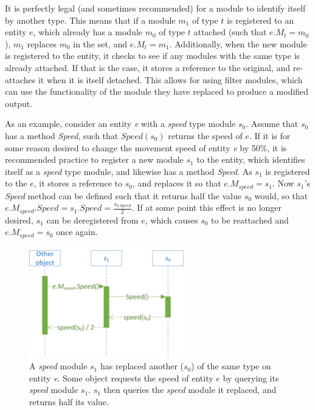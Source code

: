 It is perfectly legal (and sometimes recommended) for a module to
identify itself by another type. This means that if a module $m_{1}$
of type $t$ is registered to an entity $e$, which already has a
module $m_{0}$ of type $t$ attached (such that $e.M_{t}=m_{0}$),
$m_{1}$ replaces $m_{0}$ in the set, and $e.M_{t}=m_{1}$. Additionally,
when the new module is registered to the entity, it checks to see
if any modules with the same type is already attached. If that is
the case, it stores a reference to the original, and re-attaches it
when it is itself detached. This allows for using filter modules,
which can use the functionality of the module they have replaced to
produce a modified output.

As an example, consider an entity \emph{e} with a \emph{speed} type
module $s_{0}$. Assume that $s_{0}$ has a method \emph{Speed}, such
that $Speed(s_{0})$ returns the speed of $e$. If it is for some
reason desired to change the movement speed of entity \emph{e} by
50\%, it is recommended practice to register a new module $s_{1}$
to the entity, which identifies itself as a \emph{speed} type module,
and likewise has a method \emph{Speed}. As $s_{1}$ is registered
to the $e$, it stores a reference to $s_{0}$, and replaces it so
that $e.M_{speed}=s_{1}$. Now $s_{1}$'s \emph{Speed} method can
be defined such that it returns half the value $s_{0}$ would, so
that $e.M_{speed}.Speed=s_{1}.Speed=\frac{s_{0.Speed}}{2}$. If at
some point this effect is no longer desired, $s_{1}$ can be deregistered
from $e$, which causes $s_{0}$ to be reattached and $e.M_{speed}=s_{0}$
once again.

\begin{figure}
\begin{centering}
\includegraphics[width=0.6\textwidth]{ModulesChainingExample}
\par\end{centering}

\caption{A \emph{speed} module $s_{1}$ has replaced another ($s_{0}$) of
the same type on entity \emph{e}.\emph{ }Some object requests the
speed of entity $e$ by querying its \emph{speed} module $s_{1}$.
$s_{1}$ then queries the \emph{speed} module it replaced, and returns
half its value.}
\end{figure}


